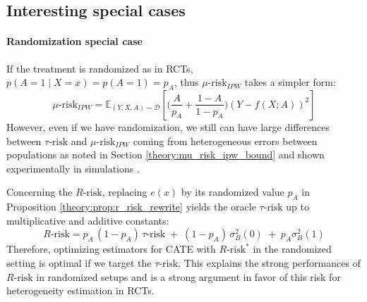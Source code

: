 \documentclass[10pt]{article}
\newtheorem{remark}{Remark}
\begin{document}
\begin{multicols}{2}

    \subsection{Interesting special cases}

    \paragraph{Randomization special case}\label{remark:rct} If the treatment is
    randomized as in RCTs, $p(A=1 \mid X=x) = p(A=1)=p_A$, thus
    $\mu\text{-risk}_{IPW}$ takes a simpler form:
    \begin{equation*}
        \mu\text{-risk}_{IPW} = \mathbb{E}_{(Y, X, A) \sim \mathcal D}\left[ \Big( \frac{A}{p_A} + \frac{1-A}{1-p_A} \Big) (Y-f(X ; A))^2 \right]
    \end{equation*}
    However, even if we have randomization, we still can have large differences
    between $\tau\text{-risk}$ and $\mu\text{-risk}_{IPW}$ coming from heterogeneous
    errors between populations as noted in Section \ref{theory:mu_risk_ipw_bound}
    and shown experimentally in simulations \cite{schuler_comparison_2018}.

    Concerning the $R\text{-risk}$, replacing $e(x)$ by its randomized value $p_A$
    in Proposition \ref{theory:prop:r_risk_rewrite} yields the oracle
    $\tau\text{-risk}$ up to multiplicative and additive constants:
    \begin{equation}
        R\text{-risk} = p_A \, (1-p_A) \, \tau\text{-risk} \;+\; (1 - p_A) \,\sigma_B^2(0) \;+\; p_A \sigma_B^2(1)
    \end{equation}
    Therefore, optimizing estimators for CATE with $R\text{-risk}^*$ in the
    randomized setting is optimal if we target the $\tau\text{-risk}$. This explains
    the strong performances of $R\text{-risk}$ in randomized setups
    \cite{schuler_comparison_2018} and is a strong argument in favor of this
    risk for heterogeneity estimation in RCTs.


\end{multicols}
\end{document}

